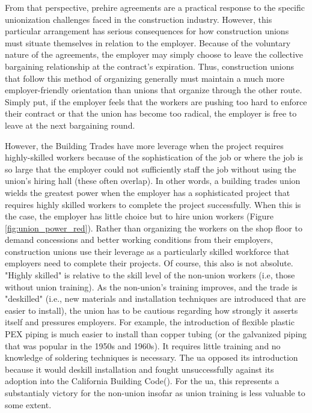 \documentclass[12pt]{article}
\begin{document}
From that perspective, prehire agreements are a practical response to the specific unionization challenges faced in the construction industry. However, this particular arrangement has serious consequences for how construction unions must situate themselves in relation to the employer. Because of the voluntary nature of the agreements, the employer may simply choose to leave the collective bargaining relationship at the contract's expiration. Thus, construction unions that follow this method of organizing generally must maintain a much more employer-friendly orientation than unions that organize through the other route. Simply put, if the employer feels that the workers are pushing too hard to enforce their contract or that the union has become too radical, the employer is free to leave at the next bargaining round.

However, the Building Trades have more leverage when the project requires highly-skilled workers because of the sophistication of the job or where the job is so large that the employer could not sufficiently staff the job without using the union's hiring hall (these often overlap). In other words, a building trades union wields the greatest power when the employer has a sophisticated project that requires highly skilled workers to complete the project successfully. When this is the case, the employer has little choice but to hire union workers (Figure \ref{fig:union_power_red}). Rather than organizing the workers on the shop floor to demand concessions and better working conditions from their employers, construction unions use their leverage as a particularly skilled workforce that employers need to complete their projects. Of course, this also is not absolute. "Highly skilled" is relative to the skill level of the non-union workers (i.e, those without union training). As the non-union's training improves, and the trade is "deskilled" (i.e., new materials and installation techniques are introduced that are easier to install), the union has to be cautious regarding how strongly it asserts itself and pressures employers. For example, the introduction of flexible plastic PEX piping is much easier to install than copper tubing (or the galvanized piping that was popular in the 1950s and 1960s). It requires little training and no knowledge of soldering techniques is necessary. The \acrfull{ua} opposed its introduction because it would deskill installation and fought unsuccessfully against its adoption into the California Building Code(\cite{faloonCaliforniaConsumerGroups2002, CaliforniaCaughtDebate2004}). For the \acrshort{ua}, this represents a substantialy victory for the non-union insofar as union training is less valuable to some extent.
\end{document}

